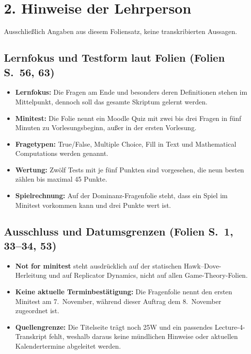 \documentclass[11pt,a4paper]{article}
\newcommand{\block}[2]{\subsection*{#1 {\normalfont\small (Folien S.~#2)}}}
\begin{document}
\section*{2. Hinweise der Lehrperson}
{\small Ausschließlich Angaben aus diesem Foliensatz, keine transkribierten Aussagen.}
\block{Lernfokus und Testform laut Folien}{56, 63}
\begin{itemize}
\item \textbf{Lernfokus:} Die Fragen am Ende und besonders deren Definitionen stehen im Mittelpunkt, dennoch soll das gesamte Skriptum gelernt werden.
\item \textbf{Minitest:} Die Folie nennt ein Moodle Quiz mit zwei bis drei Fragen in fünf Minuten zu Vorlesungsbeginn, außer in der ersten Vorlesung.
\item \textbf{Fragetypen:} True/False, Multiple Choice, Fill in Text und Mathematical Computations werden genannt.
\item \textbf{Wertung:} Zwölf Tests mit je fünf Punkten sind vorgesehen, die neun besten zählen bis maximal 45 Punkte.
\item \textbf{Spielrechnung:} Auf der Dominanz-Fragenfolie steht, dass ein Spiel im Minitest vorkommen kann und drei Punkte wert ist.
\end{itemize}
\block{Ausschluss und Datumsgrenzen}{1, 33--34, 53}
\begin{itemize}
\item \textbf{Not for minitest} steht ausdrücklich auf der statischen Hawk--Dove-Herleitung und auf Replicator Dynamics, nicht auf allen Game-Theory-Folien.
\item \textbf{Keine aktuelle Terminbestätigung:} Die Fragenfolie nennt den ersten Minitest am 7.~November, während dieser Auftrag dem 8.~November zugeordnet ist.
\item \textbf{Quellengrenze:} Die Titelseite trägt noch 25W und ein passendes Lecture-4-Transkript fehlt, weshalb daraus keine mündlichen Hinweise oder aktuellen Kalendertermine abgeleitet werden.
\end{itemize}
\end{document}
